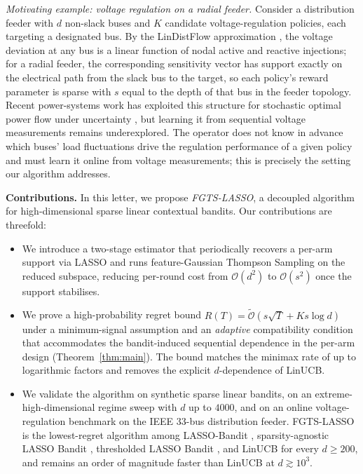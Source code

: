 \documentclass[journal,twoside,web]{ieeecolor}
\begin{document}
\textit{Motivating example: voltage regulation on a radial feeder.} Consider a distribution feeder with $d$ non-slack buses and $K$ candidate voltage-regulation policies, each targeting a designated bus. By the LinDistFlow approximation \cite{baran1989network}, the voltage deviation at any bus is a linear function of nodal active and reactive injections; for a radial feeder, the corresponding sensitivity vector has support exactly on the electrical path from the slack bus to the target, so each policy's reward parameter is sparse with $s$ equal to the depth of that bus in the feeder topology. Recent power-systems work has exploited this structure for stochastic optimal power flow under uncertainty \cite{lukashevich2023chance,lukashevich2024scenario}, but learning it from sequential voltage measurements remains underexplored. The operator does not know in advance which buses' load fluctuations drive the regulation performance of a given policy and must learn it online from voltage measurements; this is precisely the setting our algorithm addresses.

\textbf{Contributions.} In this letter, we propose \emph{FGTS-LASSO}, a decoupled algorithm for high-dimensional sparse linear contextual bandits. Our contributions are threefold:
\begin{itemize}
\item[(C1)] We introduce a two-stage estimator that periodically recovers a per-arm support via LASSO and runs feature-Gaussian Thompson Sampling \cite{agrawal2013thompson,abeille2017linear} on the reduced subspace, reducing per-round cost from $\mathcal{O}(d^2)$ to $\mathcal{O}(s^2)$ once the support stabilises.
\item[(C2)] We prove a high-probability regret bound $R(T) = \tilde{\mathcal{O}}(s\sqrt{T} + Ks\log d)$ under a minimum-signal assumption and an \emph{adaptive} compatibility condition that accommodates the bandit-induced sequential dependence in the per-arm design (Theorem~\ref{thm:main}). The bound matches the minimax rate of \cite{hao2020high} up to logarithmic factors and removes the explicit $d$-dependence of LinUCB.
\item[(C3)] We validate the algorithm on synthetic sparse linear bandits, on an extreme-high-dimensional regime sweep with $d$ up to $4000$, and on an online voltage-regulation benchmark on the IEEE 33-bus distribution feeder. FGTS-LASSO is the lowest-regret algorithm among LASSO-Bandit \cite{bastani2020online}, sparsity-agnostic LASSO Bandit \cite{oh2021sparsity}, thresholded LASSO Bandit \cite{ariu2022thresholded}, and LinUCB \cite{chu2011contextual} for every $d \geq 200$, and remains an order of magnitude faster than LinUCB at $d \gtrsim 10^3$.
\end{itemize}
\end{document}
